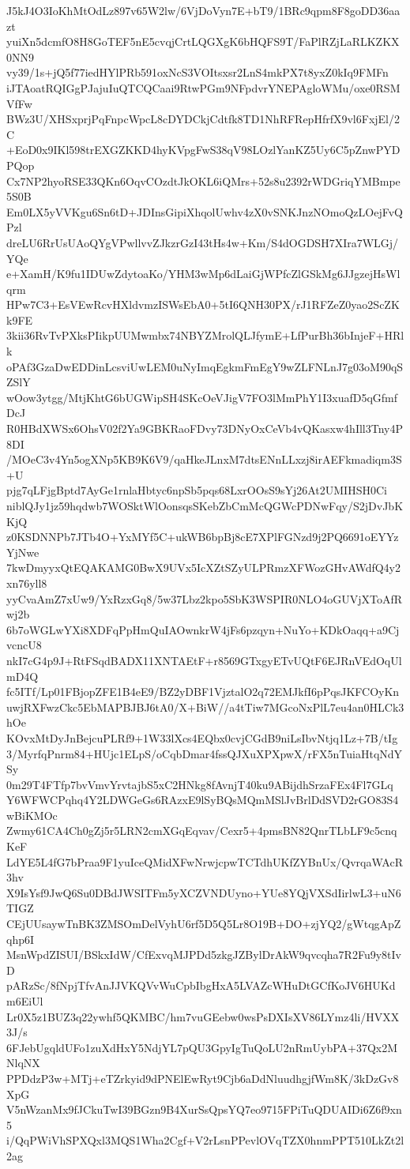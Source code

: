 J5kJ4O3IoKhMtOdLz897v65W2lw/6VjDoVyn7E+bT9/1BRc9qpm8F8goDD36aazt
yuiXn5dcmfO8H8GoTEF5nE5cvqjCrtLQGXgK6bHQFS9T/FaPlRZjLaRLKZKX0NN9
vy39/1s+jQ5f77iedHYlPRb591oxNcS3VOItsxsr2LnS4mkPX7t8yxZ0kIq9FMFn
iJTAoatRQIGgPJajuIuQTCQCaai9RtwPGm9NFpdvrYNEPAgloWMu/oxe0RSMVfFw
BWz3U/XHSxprjPqFnpcWpcL8cDYDCkjCdtfk8TD1NhRFRepHfrfX9vl6FxjEl/2C
+EoD0x9IKl598trEXGZKKD4hyKVpgFwS38qV98LOzlYanKZ5Uy6C5pZnwPYDPQop
Cx7NP2hyoRSE33QKn6OqvCOzdtJkOKL6iQMrs+52s8u2392rWDGriqYMBmpe5S0B
Em0LX5yVVKgu6Sn6tD+JDInsGipiXhqolUwhv4zX0vSNKJnzNOmoQzLOejFvQPzl
dreLU6RrUsUAoQYgVPwllvvZJkzrGzI43tHs4w+Km/S4dOGDSH7XIra7WLGj/YQe
e+XamH/K9fu1IDUwZdytoaKo/YHM3wMp6dLaiGjWPfcZlGSkMg6JJgzejHsWlqrm
HPw7C3+EsVEwRcvHXldvmzISWsEbA0+5tI6QNH30PX/rJ1RFZeZ0yao2ScZKk9FE
3kii36RvTvPXksPIikpUUMwmbx74NBYZMrolQLJfymE+LfPurBh36bInjeF+HRlk
oPAf3GzaDwEDDinLcsviUwLEM0uNyImqEgkmFmEgY9wZLFNLnJ7g03oM90qSZSlY
wOow3ytgg/MtjKhtG6bUGWipSH4SKcOeVJigV7FO3lMmPhY1I3xuafD5qGfmfDcJ
R0HBdXWSx6OhsV02f2Ya9GBKRaoFDvy73DNyOxCeVb4vQKasxw4hIll3Tny4P8DI
/MOeC3v4Yn5ogXNp5KB9K6V9/qaHkeJLnxM7dtsENnLLxzj8irAEFkmadiqm3S+U
pjg7qLFjgBptd7AyGe1rnlaHbtyc6npSb5pqs68LxrOOsS9sYj26At2UMIHSH0Ci
niblQJy1jz59hqdwb7WOSktWlOonsqsSKebZbCmMcQGWcPDNwFqy/S2jDvJbKKjQ
z0KSDNNPb7JTb4O+YxMYf5C+ukWB6bpBj8cE7XPlFGNzd9j2PQ6691oEYYzYjNwe
7kwDmyyxQtEQAKAMG0BwX9UVx5IcXZtSZyULPRmzXFWozGHvAWdfQ4y2xn76yll8
yyCvaAmZ7xUw9/YxRzxGq8/5w37Lbz2kpo5SbK3WSPIR0NLO4oGUVjXToAfRwj2b
6b7oWGLwYXi8XDFqPpHmQuIAOwnkrW4jFs6pzqyn+NuYo+KDkOaqq+a9CjvcncU8
nkI7cG4p9J+RtFSqdBADX11XNTAEtF+r8569GTxgyETvUQtF6EJRnVEdOqUlmD4Q
fc5ITf/Lp01FBjopZFE1B4eE9/BZ2yDBF1VjztalO2q72EMJkfI6pPqsJKFCOyKn
uwjRXFwzCkc5EbMAPBJBJ6tA0/X+BiW//a4tTiw7MGcoNxPlL7eu4an0HLCk3hOe
KOvxMtDyJnBejcuPLRf9+1W33lXcs4EQbx0cvjCGdB9niLsIbvNtjq1Lz+7B/tIg
3/MyrfqPnrm84+HUjc1ELpS/oCqbDmar4fssQJXuXPXpwX/rFX5nTuiaHtqNdYSy
0m29T4FTfp7bvVmvYrvtajbS5xC2HNkg8fAvnjT40ku9ABijdhSrzaFEx4Fl7GLq
Y6WFWCPqhq4Y2LDWGeGs6RAzxE9lSyBQsMQmMSlJvBrlDdSVD2rGO83S4wBiKMOc
Zwmy61CA4Ch0gZj5r5LRN2cmXGqEqvav/Cexr5+4pmsBN82QnrTLbLF9c5cnqKeF
LdYE5L4fG7bPraa9F1yuIceQMidXFwNrwjcpwTCTdhUKfZYBnUx/QvrqaWAcR3hv
X9IsYsf9JwQ6Su0DBdJWSITFm5yXCZVNDUyno+YUe8YQjVXSdIirlwL3+uN6TIGZ
CEjUUsaywTnBK3ZMSOmDelVyhU6rf5D5Q5Lr8O19B+DO+zjYQ2/gWtqgApZqhp6I
MsnWpdZISUI/BSkxIdW/CfExvqMJPDd5zkgJZBylDrAkW9qvcqha7R2Fu9y8tIvD
pARzSc/8fNpjTfvAnJJVKQVvWuCpbIbgHxA5LVAZcWHuDtGCfKoJV6HUKdm6EiUl
Lr0X5z1BUZ3q22ywhf5QKMBC/hm7vuGEebw0wsPsDXIsXV86LYmz4li/HVXX3J/s
6FJebUgqldUFo1zuXdHxY5NdjYL7pQU3GpyIgTuQoLU2nRmUybPA+37Qx2MNlqNX
PPDdzP3w+MTj+eTZrkyid9dPNElEwRyt9Cjb6aDdNluudhgjfWm8K/3kDzGv8XpG
V5nWzanMx9fJCkuTwI39BGzn9B4XurSsQpsYQ7eo9715FPiTuQDUAIDi6Z6f9xn5
i/QqPWiVhSPXQxl3MQS1Wha2Cgf+V2rLsnPPevlOVqTZX0hnmPPT510LkZt2l2ag
